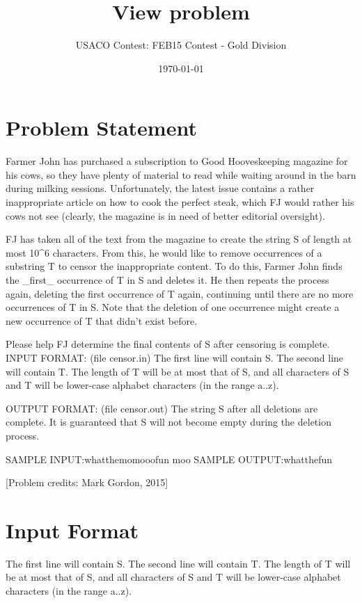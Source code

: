 \documentclass[12pt]{article}
\title{View problem}
\author{USACO Contest: FEB15 Contest - Gold Division}
\date{\today}
\begin{document}
\maketitle

\section*{Problem Statement}

Farmer John has purchased a subscription to Good Hooveskeeping magazine for his cows, so they have plenty of material to read while waiting around in the barn during milking sessions.  Unfortunately, the latest issue contains a rather inappropriate article on how to cook the perfect steak, which FJ would rather his cows not see (clearly, the magazine is in need of better editorial oversight).

FJ has taken all of the text from the magazine to create the string S of length at most 10^6 characters.  From this, he would like to remove occurrences of a substring T to censor the inappropriate content.  To do this, Farmer John finds the _first_ occurrence of T in S and deletes it.  He then repeats the process again, deleting the first occurrence of T again, continuing until there are no more occurrences of T in S.  Note that the deletion of one occurrence might create a new occurrence of T that didn't exist before.

Please help FJ determine the final contents of S after censoring is complete.
INPUT FORMAT: (file censor.in)
The first line will contain S.  The second line will contain T.  The length of T will be at most that of S, and all characters of S and T will be lower-case alphabet characters (in the range a..z).

OUTPUT FORMAT: (file censor.out)
The string S after all deletions are complete.  It is guaranteed that S will not become empty during the deletion process.

SAMPLE INPUT:whatthemomooofun
moo
SAMPLE OUTPUT:whatthefun

[Problem credits: Mark Gordon, 2015]



\section*{Input Format}
The first line will contain S.  The second line will contain T.  The length of T will be at most that of S, and all characters of S and T will be lower-case alphabet characters (in the range a..z).
\end{document}

